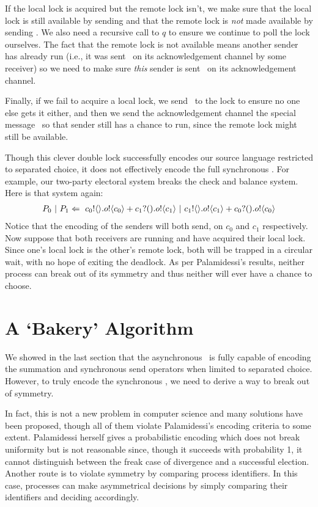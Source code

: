 If the local lock is acquired but the remote lock isn't, we make sure that the local lock is still available by sending  and that the remote lock is \emph{not} made available by sending .  
We also need a recursive call to $q$ to ensure we continue to poll the lock ourselves.  
The fact that the remote lock is not available means another sender has already run (i.e., it was sent \ptrue\ on its acknowledgement channel by some receiver) so we need to make sure \emph{this} sender is sent \pfalse\ on its acknowledgement channel.

Finally, if we fail to acquire a local lock, we send \pfalse\ to the lock to ensure no one else gets it either, and then we send the acknowledgement channel the special message \pretry\ so that sender still has a chance to run, since the remote lock might still be available.

Though this clever double lock successfully encodes our source language restricted to separated choice, it does not effectively encode the full synchronous \picalc.  
For example, our two-party electoral system breaks the check and balance system.  Here is that system again:
\begin{align}
	P_0\ |\  P_1 \Leftarrow\  {c_0}!\langle{}\rangle. {o}!\langle{c_0}\rangle + {c_1}?({}). {o}!\langle{c_1}\rangle \ |\  {c_1}!\langle{}\rangle. {o}!\langle{c_1}\rangle + {c_0}?({}). {o}!\langle{c_0}\rangle
\end{align}
Notice that the encoding of the senders will both send, on $c_0$ and $c_1$ respectively.  
Now suppose that both receivers are running and have acquired their local lock.  
Since one's local lock is the other's remote lock, both will be trapped in a circular wait, with no hope of exiting the deadlock.  
As per Palamidessi's results, neither process can break out of its symmetry and thus neither will ever have a chance to choose.

\section{A `Bakery' Algorithm}
We showed in the last section that the asynchronous \picalc\ is fully capable of encoding the summation and synchronous send operators when limited to separated choice.
However, to truly encode the synchronous \picalc, we need to derive a way to break out of symmetry.

In fact, this is not a new problem in computer science and many solutions have been proposed, though all of them violate Palamidessi's encoding criteria to some extent.
Palamidessi herself gives a probabilistic encoding \cite{palam01} which does not break uniformity  but is not reasonable  since, though it succeeds with probability 1, it cannot distinguish between the freak case of divergence and a successful election.
Another route is to violate symmetry by comparing process identifiers.
In this case, processes can make asymmetrical decisions by simply comparing their identifiers and deciding accordingly.

